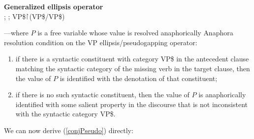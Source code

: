 \documentclass[output=paper,colorlinks,citecolor=brown]{langscibook}
\begin{document}
\begin{exe}
 \ex\label{generalized}
  \textbf{Generalized ellipsis operator} \\
  ; ; VP\$\ensuremath{\vs}(VP\$/VP\$)

  ---where $P$ is a free variable whose value is
  resolved anaphorically
 \ex\label{Acondition}
  Anaphora resolution condition on the VP ellipsis/pseudogapping
  operator:
  \begin{enumerate}
   \item
    if there is a syntactic  constituent
    with category VP\$ in the antecedent clause matching the
    syntactic  category of the missing verb in the target clause,
    then the value of $P$ is identified with the denotation of that constituent;
   \item
    if there is no such syntactic  constituent, then the value of $P$  is anaphorically
    identified with some salient property in the discourse that is not
    inconsistent with the syntactic  category VP\$.
  \end{enumerate}
\end{exe}
We can now derive (\ref{conjPseudo}) directly:
\end{document}
